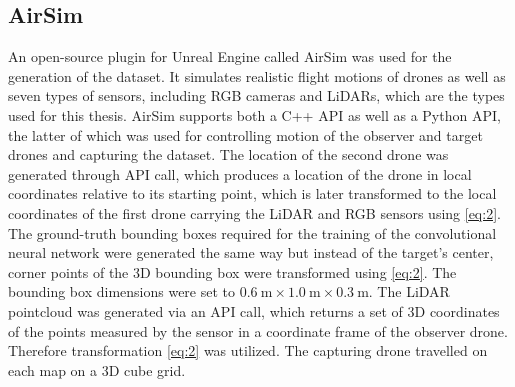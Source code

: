 \documentclass[twoside]{ctuthesis}
\theoremstyle{plain}
\theoremstyle{definition}
\theoremstyle{note}
\begin{document}
\subsection{AirSim}
An open-source plugin for Unreal Engine called AirSim was used for the generation of the dataset. It simulates realistic flight motions of drones as well as seven types of sensors, including RGB cameras and LiDARs, which are the types used for this thesis. AirSim supports both a C++ API as well as a Python API, the latter of which was used for controlling motion of the observer and target drones and capturing the dataset. The location of the second drone was generated through API call, which produces a location of the drone in local coordinates relative to its starting point, which is later transformed to the local coordinates of the first drone carrying the LiDAR and RGB sensors using \eqref{eq:2}. The ground-truth bounding boxes required for the training of the convolutional neural network were generated the same way but instead of the target's center, corner points of the 3D bounding box were transformed using \eqref{eq:2}. The bounding box dimensions were set to $\SI{0.6}{\metre} \times \SI{1.0}{\metre} \times \SI{0.3}{\metre}$. The LiDAR pointcloud was generated via an API call, which returns a set of 3D coordinates of the points measured by the sensor in a coordinate frame of the observer drone. Therefore transformation \eqref{eq:2} was utilized. The capturing drone travelled on each map on a 3D cube grid.
\end{document}
